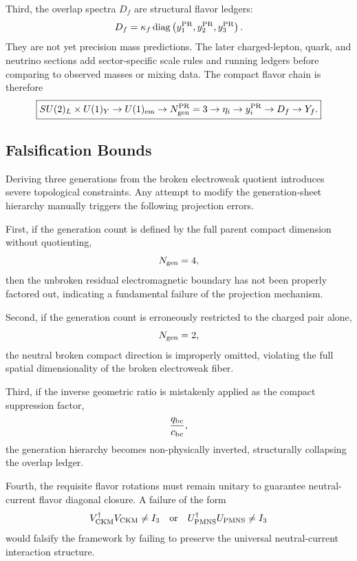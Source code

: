 \documentclass[11pt]{article}
\begin{document}
Third, the overlap spectra \(D_f\) are structural flavor ledgers:
\begin{equation}
D_f
=
\kappa_f
\operatorname{diag}
\left(
y_1^{\rm PR},
y_2^{\rm PR},
y_3^{\rm PR}
\right).
\end{equation}
They are not yet precision mass predictions. 
The later charged-lepton, quark, and neutrino sections add sector-specific scale rules and running ledgers before comparing to observed masses or mixing data. The compact flavor chain is therefore
\begin{equation}
\boxed{
SU(2)_L\times U(1)_Y
\rightarrow
U(1)_{\rm em}
\rightarrow
N_{\rm gen}^{\rm PR}=3
\rightarrow
\eta_i
\rightarrow
y_i^{\rm PR}
\rightarrow
D_f
\rightarrow
Y_f.
}
\end{equation}

\subsection{Falsification Bounds}
\label{sec:pr2_generation_flavor_negative_controls}

Deriving three generations from the broken electroweak quotient introduces severe topological constraints. Any attempt to modify the generation-sheet hierarchy manually triggers the following projection errors.

First, if the generation count is defined by the full parent compact dimension without quotienting,
\begin{equation}
N_{\rm gen}=4,
\end{equation}
then the unbroken residual electromagnetic boundary has not been properly factored out, indicating a fundamental failure of the projection mechanism.

Second, if the generation count is erroneously restricted to the charged pair alone,
\begin{equation}
N_{\rm gen}=2,
\end{equation}
the neutral broken compact direction is improperly omitted, violating the full spatial dimensionality of the broken electroweak fiber.

Third, if the inverse geometric ratio is mistakenly applied as the compact suppression factor,
\begin{equation}
\frac{q_{\rm bc}}{c_{\rm bc}},
\end{equation}
the generation hierarchy becomes non-physically inverted, structurally collapsing the overlap ledger.

Fourth, the requisite flavor rotations must remain unitary to guarantee neutral-current flavor diagonal closure. A failure of the form
\begin{equation}
V_{\rm CKM}^{\dagger}V_{\rm CKM}\neq I_3
\quad
\text{or}
\quad
U_{\rm PMNS}^{\dagger}U_{\rm PMNS}\neq I_3
\end{equation}
would falsify the framework by failing to preserve the universal neutral-current interaction structure.
\end{document}
